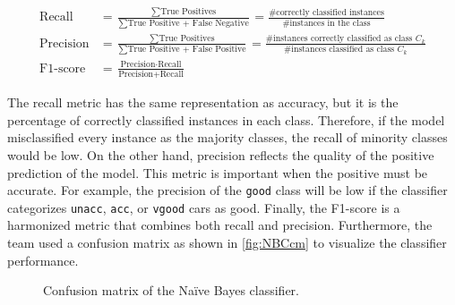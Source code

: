 \documentclass[a4paper]{article}
\begin{document}
\begin{subequations}
\begin{align}
  \text{Recall} &= \frac{\sum \text{True Positives}}{\sum \text{True Positive + False Negative}} = \frac{\text{\# correctly classified instances}}{\text{\# instances in the class}} \\
  \text{Precision} &= \frac{\sum \text{True Positives}}{\sum \text{True Positive + False Positive}} = \frac{\text{\# instances correctly classified as class } C_k}{\text{\# instances classified as class } C_k} \\
  \text{F1-score} &= \frac{\text{Precision}\cdot\text{Recall}}{\text{Precision}+\text{Recall}}
\end{align}
\end{subequations}

The recall metric has the same representation as accuracy, but it is the percentage of correctly classified instances in each class. Therefore, if the model misclassified every instance as the majority classes, the recall of minority classes would be low. On the other hand, precision reflects the quality of the positive prediction of the model. This metric is important when the positive must be accurate. For example, the precision of the \lstinline{good} class will be low if the classifier categorizes \lstinline{unacc}, \lstinline{acc}, or \lstinline{vgood} cars as good. Finally, the F1-score is a harmonized metric that combines both recall and precision. Furthermore, the team used a confusion matrix as shown in \autoref{fig:NBCcm} to visualize the classifier performance.

\begin{figure} [h!]
  \caption{Confusion matrix of the Naïve Bayes classifier.} 
  \label{fig:NBCcm}
\end{figure}
\end{document}
